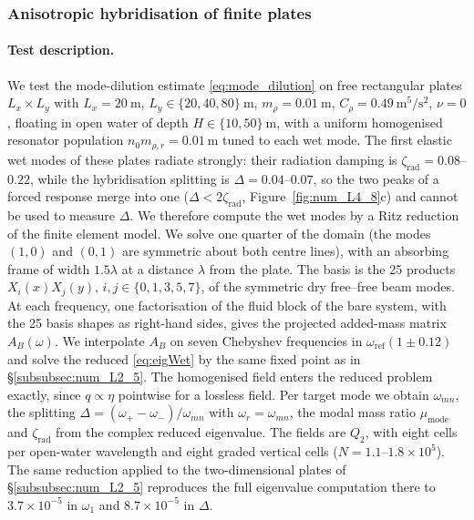 {\color{red}
\subsubsection{Anisotropic hybridisation of finite plates}\label{subsubsec:num_L4_8}

\paragraph{Test description.} We test the mode-dilution estimate \eqref{eq:mode_dilution} on free rectangular plates $L_x\times L_y$ with $L_x=20~\si{\meter}$, $L_y\in\{20,40,80\}~\si{\meter}$, $m_\rho=0.01~\si{\meter}$, $C_\rho=0.49~\si{\meter\tothe{5}\per\second\squared}$, $\nu=0$, floating in open water of depth $H\in\{10,50\}~\si{\meter}$, with a uniform homogenised resonator population $n_0m_{\rho,r}=0.01~\si{\meter}$ tuned to each wet mode. The first elastic wet modes of these plates radiate strongly: their radiation damping is $\zeta_\mathrm{rad}=0.08$--$0.22$, while the hybridisation splitting is $\Delta=0.04$--$0.07$, so the two peaks of a forced response merge into one ($\Delta<2\zeta_\mathrm{rad}$, Figure~\ref{fig:num_L4_8}c) and cannot be used to measure $\Delta$. We therefore compute the wet modes by a Ritz reduction of the finite element model. We solve one quarter of the domain (the modes $(1,0)$ and $(0,1)$ are symmetric about both centre lines), with an absorbing frame of width $1.5\lambda$ at a distance $\lambda$ from the plate. The basis is the 25 products $X_i(x)X_j(y)$, $i,j\in\{0,1,3,5,7\}$, of the symmetric dry free--free beam modes. At each frequency, one factorisation of the fluid block of the bare system, with the 25 basis shapes as right-hand sides, gives the projected added-mass matrix $A_B(\omega)$. We interpolate $A_B$ on seven Chebyshev frequencies in $\omega_\mathrm{ref}(1\pm0.12)$ and solve the reduced \eqref{eq:eigWet} by the same fixed point as in \S\ref{subsubsec:num_L2_5}. The homogenised field enters the reduced problem exactly, since $q\propto\eta$ pointwise for a lossless field. Per target mode we obtain $\omega_{mn}$, the splitting $\Delta=(\omega_+-\omega_-)/\omega_{mn}$ with $\omega_r=\omega_{mn}$, the modal mass ratio $\mu_\mathrm{mode}$ and $\zeta_\mathrm{rad}$ from the complex reduced eigenvalue. The fields are $Q_2$, with eight cells per open-water wavelength and eight graded vertical cells ($N=1.1$--$1.8\times10^5$). The same reduction applied to the two-dimensional plates of \S\ref{subsubsec:num_L2_5} reproduces the full eigenvalue computation there to $3.7\times10^{-5}$ in $\omega_1$ and $8.7\times10^{-5}$ in $\Delta$.

}
